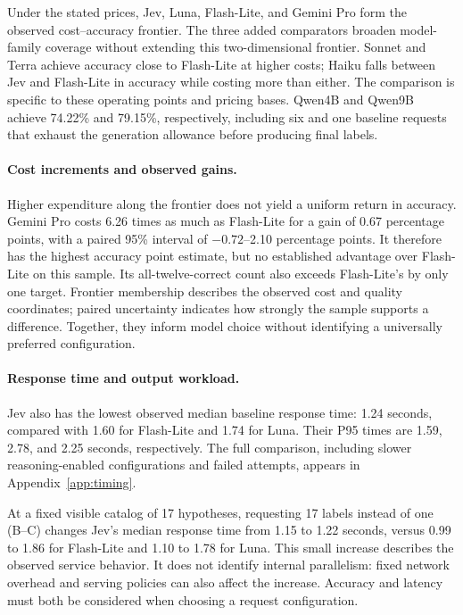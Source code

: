 \documentclass{article}
\begin{document}
Under the stated prices, Jev, Luna, Flash-Lite, and Gemini Pro form the observed cost--accuracy frontier. The three added comparators broaden model-family coverage without extending this two-dimensional frontier. Sonnet and Terra achieve accuracy close to Flash-Lite at higher costs; Haiku falls between Jev and Flash-Lite in accuracy while costing more than either. The comparison is specific to these operating points and pricing bases. Qwen4B and Qwen9B achieve 74.22\% and 79.15\%, respectively, including six and one baseline requests that exhaust the generation allowance before producing final labels.

\paragraph{Cost increments and observed gains.}
Higher expenditure along the frontier does not yield a uniform return in accuracy. Gemini Pro costs 6.26 times as much as Flash-Lite for a gain of 0.67 percentage points, with a paired 95\% interval of $-0.72$--2.10 percentage points. It therefore has the highest accuracy point estimate, but no established advantage over Flash-Lite on this sample. Its all-twelve-correct count also exceeds Flash-Lite's by only one target. Frontier membership describes the observed cost and quality coordinates; paired uncertainty indicates how strongly the sample supports a difference. Together, they inform model choice without identifying a universally preferred configuration.

\paragraph{Response time and output workload.}
Jev also has the lowest observed median baseline response time: 1.24 seconds, compared with 1.60 for Flash-Lite and 1.74 for Luna. Their P95 times are 1.59, 2.78, and 2.25 seconds, respectively. The full comparison, including slower reasoning-enabled configurations and failed attempts, appears in Appendix~\ref{app:timing}.

At a fixed visible catalog of 17 hypotheses, requesting 17 labels instead of one (B--C) changes Jev's median response time from 1.15 to 1.22 seconds, versus 0.99 to 1.86 for Flash-Lite and 1.10 to 1.78 for Luna. This small increase describes the observed service behavior. It does not identify internal parallelism: fixed network overhead and serving policies can also affect the increase. Accuracy and latency must both be considered when choosing a request configuration.
\end{document}
